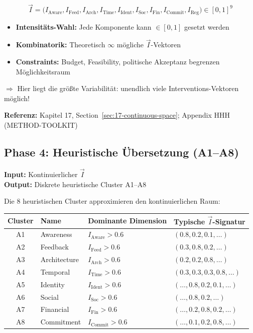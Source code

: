 \begin{equation}
\vec{I} = \bigl(I_{\text{Aware}}, I_{\text{Feed}}, I_{\text{Arch}}, I_{\text{Time}}, I_{\text{Ident}}, I_{\text{Soc}}, I_{\text{Fin}}, I_{\text{Commit}}, I_{\text{Reg}}\bigr) \in [0,1]^9
\end{equation}

\begin{tcolorbox}[colback=orange!5!white, colframe=orange!75!black,
    title=\textbf{Variabilität in Phase 3}]
\begin{itemize}[nosep]
\item \textbf{Intensitäts-Wahl:} Jede Komponente kann $\in [0,1]$ gesetzt werden
\item \textbf{Kombinatorik:} Theoretisch $\infty$ mögliche $\vec{I}$-Vektoren
\item \textbf{Constraints:} Budget, Feasibility, politische Akzeptanz begrenzen Möglichkeitsraum
\end{itemize}
$\Rightarrow$ Hier liegt die größte Variabilität: unendlich viele Interventions-Vektoren möglich!
\end{tcolorbox}

\textbf{Referenz:} Kapitel 17, Section~\ref{sec:17-continuous-space}; Appendix HHH (METHOD-TOOLKIT)

\subsection{Phase 4: Heuristische Übersetzung (A1--A8)}
\label{sec:20-phase4}

\textbf{Input:} Kontinuierlicher $\vec{I}$\\
\textbf{Output:} Diskrete heuristische Cluster A1--A8

Die 8 heuristischen Cluster approximieren den kontinuierlichen Raum:

\begin{center}
\renewcommand{\arraystretch}{1.2}
\footnotesize
\begin{tabular}{@{}clp{3.5cm}p{3.5cm}@{}}
\toprule
\textbf{Cluster} & \textbf{Name} & \textbf{Dominante Dimension} & \textbf{Typische $\vec{I}$-Signatur} \\
\midrule
A1 & Awareness & $I_{\text{Aware}} > 0.6$ & $(0.8, 0.2, 0.1, \ldots)$ \\
A2 & Feedback & $I_{\text{Feed}} > 0.6$ & $(0.3, 0.8, 0.2, \ldots)$ \\
A3 & Architecture & $I_{\text{Arch}} > 0.6$ & $(0.2, 0.2, 0.8, \ldots)$ \\
A4 & Temporal & $I_{\text{Time}} > 0.6$ & $(0.3, 0.3, 0.3, 0.8, \ldots)$ \\
A5 & Identity & $I_{\text{Ident}} > 0.6$ & $(\ldots, 0.8, 0.2, 0.1, \ldots)$ \\
A6 & Social & $I_{\text{Soc}} > 0.6$ & $(\ldots, 0.8, 0.2, \ldots)$ \\
A7 & Financial & $I_{\text{Fin}} > 0.6$ & $(\ldots, 0.2, 0.8, 0.2, \ldots)$ \\
A8 & Commitment & $I_{\text{Commit}} > 0.6$ & $(\ldots, 0.1, 0.2, 0.8, \ldots)$ \\
\bottomrule
\end{tabular}
\end{center}

